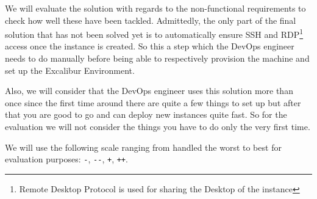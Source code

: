 



We will evaluate the solution with regards to the non-functional
requirements to check how well these have been tackled. Admittedly,
the only part of the final solution that has not been solved yet is to
automatically ensure SSH and RDP\footnote{Remote Desktop Protocol is
used for sharing the Desktop of the instance} access once the instance
is created.  So this a step which the DevOps engineer needs to do
manually before being able to respectively provision the machine and
set up the Excalibur Environment.

Also, we will consider that the DevOps engineer uses this solution
more than once since the first time around there are quite a few
things to set up but after that you are good to go and can deploy new
instances quite fast. So for the evaluation we will not consider the
things you have to do only the very first time.

We will use the following scale ranging from handled the worst to best
for evaluation purposes: \verb|-|, \verb|--|, \verb|+|, \verb|++|.

